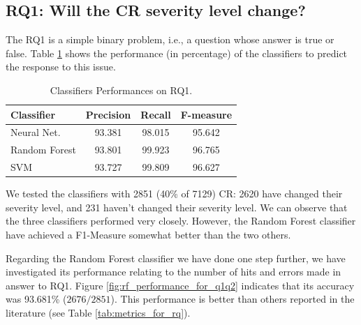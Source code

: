 \documentclass[10pt, conference]{IEEEtran}
\begin{document}
\subsection{RQ1: Will the CR severity level change?}

The RQ1 is a simple binary problem, i.e., a question whose answer is true or false. Table \ref{tab:metrics_for_rq1} shows the performance (in percentage) of the classifiers to predict the response to this issue.


\begin{table}[!ht]
	\renewcommand{\arraystretch}{1.5}
	\caption{Classifiers Performances on RQ1.}
	\label{tab:metrics_for_rq1}
	\centering
	\begin{tabular}{|l|c|c|c|}
		\hline
		Classifier & Precision & Recall & F-measure\\
		\hline 
		Neural Net. & 93.381 & 98.015 & 95.642\\
		\hline
		Random Forest & 93.801 & 99.923 & 96.765\\
        \hline
		SVM & 93.727 & 99.809 & 96.627 \\
		\hline
		
	\end{tabular}
\end{table}

We tested the classifiers with 2851 (40\% of 7129) CR: 2620 have changed their severity level, and 231 haven't changed their severity level. We can observe that the three classifiers performed very closely. However, the Random Forest classifier have achieved a F1-Measure somewhat better than the two others. 

Regarding the Random Forest classifier we have done one step further, we have investigated its performance relating to the number of hits and errors made in answer to RQ1. Figure \ref{fig:rf_performance_for_q1q2} indicates that its accuracy was 93.681\% ($2676 / 2851$). This performance is better than others \cite{Lamkanfi2010, ValdiviaGarcia2014} reported in the literature (see Table \ref{tab:metrics_for_rq}).
\end{document}
